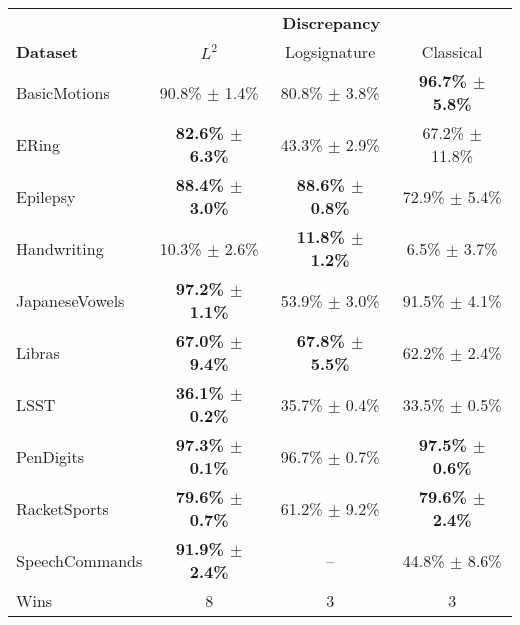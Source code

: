 \begin{tabular}{lccc}
\toprule
{} & \multicolumn{3}{c}{\textbf{Discrepancy}} \\ \cmidrule{2-4}
\textbf{Dataset} &          $L^2$ &   Logsignature &                Classical \\
\midrule
BasicMotions    &    90.8\% $\pm$ 1.4\% &  80.8\% $\pm$ 3.8\% &  \textbf{96.7\% $\pm$ 5.8\%} \\
ERing           &    \textbf{82.6\% $\pm$ 6.3\%} &  43.3\% $\pm$ 2.9\% &  67.2\% $\pm$ 11.8\% \\
Epilepsy        &    \textbf{88.4\% $\pm$ 3.0\%} &  \textbf{88.6\% $\pm$ 0.8\%} &  72.9\% $\pm$ 5.4\% \\
Handwriting     &    10.3\% $\pm$ 2.6\% &  \textbf{11.8\% $\pm$ 1.2\%} &  6.5\% $\pm$ 3.7\% \\
JapaneseVowels  &    \textbf{97.2\% $\pm$ 1.1\%} &  53.9\% $\pm$ 3.0\% &  91.5\% $\pm$ 4.1\% \\
Libras          &    \textbf{67.0\% $\pm$ 9.4\%} &  \textbf{67.8\% $\pm$ 5.5\%} &  62.2\% $\pm$ 2.4\% \\
LSST            &    \textbf{36.1\% $\pm$ 0.2\%} &  35.7\% $\pm$ 0.4\% &  33.5\% $\pm$ 0.5\% \\
PenDigits       &    \textbf{97.3\% $\pm$ 0.1\%} &  96.7\% $\pm$ 0.7\% &  \textbf{97.5\% $\pm$ 0.6\%} \\
RacketSports    &    \textbf{79.6\% $\pm$ 0.7\%} &  61.2\% $\pm$ 9.2\% &  \textbf{79.6\% $\pm$ 2.4\%} \\
\midrule
SpeechCommands  &    \textbf{91.9\% $\pm$ 2.4\%} & -- & 44.8\% $\pm$ 8.6\% \\
\midrule
Wins &            8 &                 3 &    3 \\
\bottomrule
\end{tabular}
